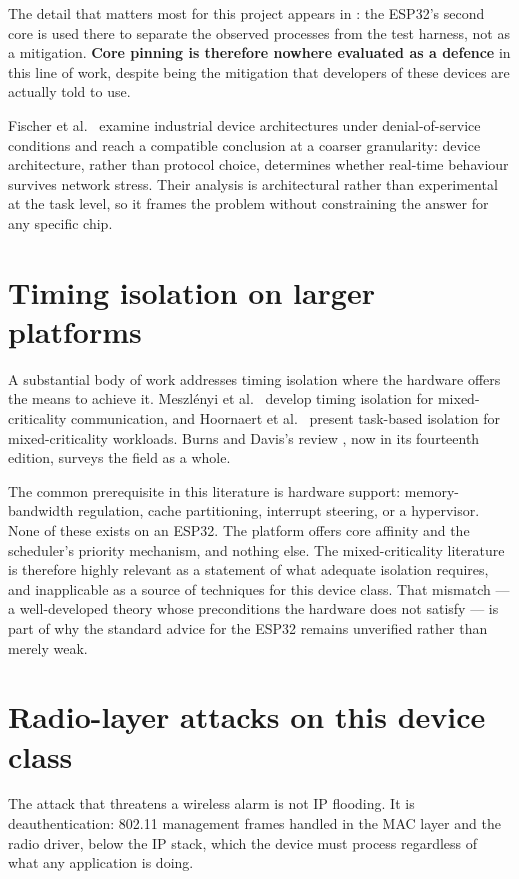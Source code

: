 The detail that matters most for this project appears in \cite{behnke2023}: the ESP32's second
core is used there to separate the observed processes from the test harness, not as a
mitigation. \textbf{Core pinning is therefore nowhere evaluated as a defence} in this line of
work, despite being the mitigation that developers of these devices are actually told to use.

Fischer et al.\ \cite{fischer2020} examine industrial device architectures under
denial-of-service conditions and reach a compatible conclusion at a coarser granularity: device
architecture, rather than protocol choice, determines whether real-time behaviour survives
network stress. Their analysis is architectural rather than experimental at the task level, so
it frames the problem without constraining the answer for any specific chip.

\section{Timing isolation on larger platforms}

A substantial body of work addresses timing isolation where the hardware offers the means to
achieve it. Meszlényi et al.\ \cite{timingiso2025} develop timing isolation for
mixed-criticality communication, and Hoornaert et al.\ \cite{mcti2024} present task-based
isolation for mixed-criticality workloads. Burns and Davis's review \cite{mcreview2026}, now in
its fourteenth edition, surveys the field as a whole.

The common prerequisite in this literature is hardware support: memory-bandwidth regulation,
cache partitioning, interrupt steering, or a hypervisor. None of these exists on an ESP32. The
platform offers core affinity and the scheduler's priority mechanism, and nothing else. The
mixed-criticality literature is therefore highly relevant as a statement of what adequate
isolation requires, and inapplicable as a source of techniques for this device class. That
mismatch — a well-developed theory whose preconditions the hardware does not satisfy — is part
of why the standard advice for the ESP32 remains unverified rather than merely weak.

\section{Radio-layer attacks on this device class}

The attack that threatens a wireless alarm is not IP flooding. It is deauthentication: 802.11
management frames handled in the MAC layer and the radio driver, below the IP stack, which the
device must process regardless of what any application is doing.

